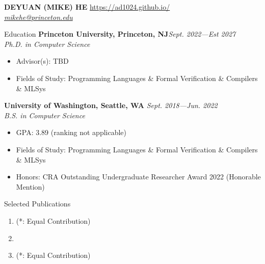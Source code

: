 \documentclass{resume}
\begin{document}
\vspace{-0.5in}

\MakeUppercase{\Large{\textbf{Deyuan (Mike) He}}}
\hfill\href{https://ad1024.github.io/}{https://ad1024.github.io/}\\ {\em{\href{mailto:mikehe@princeton.edu}{mikehe@princeton.edu}}}
\vspace{-5pt}

	\begin{rSection}{Education}
    {\bf Princeton University, Princeton, NJ}\hfill {\em Sept. 2022---Est 2027} \\
    \textit{Ph.D. in Computer Science}
    \vspace{-5pt}
    \begin{itemize}[leftmargin=*]
        \setlength{\itemsep}{1pt}
        \setlength{\parskip}{0pt}
        \setlength{\parsep}{0pt}
        \item Advisor(s): TBD
        \item Fields of Study: Programming Languages \& Formal Verification \& Compilers \& MLSys
    \end{itemize}
	{\bf University of Washington, Seattle, WA} \hfill {\em Sept. 2018---Jun. 2022} \\
	\textit{B.S. in Computer Science}
	\vspace{-5pt}
        \begin{itemize}[leftmargin=*]
            \setlength{\itemsep}{1pt}
            \setlength{\parskip}{0pt}
			\setlength{\parsep}{0pt}
			\item GPA: 3.89 (ranking not applicable)
            \item Fields of Study: Programming Languages \& Formal Verification \& Compilers \& MLSys
            \item Honors: CRA Outstanding Undergraduate Researcher Award 2022 (Honorable Mention)
		\end{itemize}
	\end{rSection}
	\vspace{-5pt}
    \begin{rSection}{Selected Publications}
		\begin{enumerate}[leftmargin=5pt]
			\setlength{\itemsep}{5pt}
            \setlength{\parskip}{0pt}
			\setlength{\parsep}{0pt}
			\item {} (\small{*: Equal Contribution})
			\item {}
			\item {} (\small{*: Equal Contribution})
		\end{enumerate}
        \vspace{-5pt}
	\end{rSection}
    \vspace{1pt}
\end{document}
